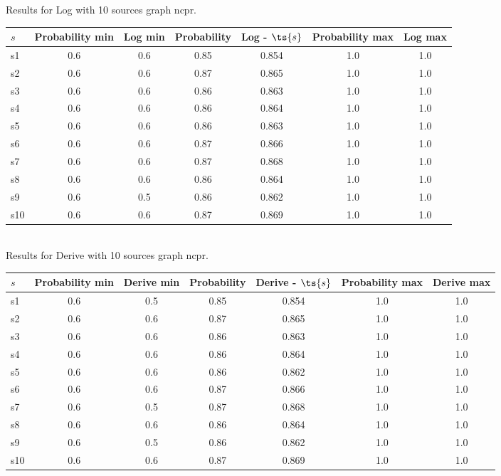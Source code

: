 \documentclass{article}
\begin{document}
\noindent Results for Log with 10 sources graph ncpr.

\noindent\begin{tabular}{|l|c|c|c|c|c|c|}
\hline
$s$& Probability min & Log min & Probability & Log - $\ts{s}$ & Probability max & Log max\\
\hline
s1 &0.6 & 0.6 & 0.85 & 0.854 & 1.0 & 1.0\\
\hline
s2 &0.6 & 0.6 & 0.87 & 0.865 & 1.0 & 1.0\\
\hline
s3 &0.6 & 0.6 & 0.86 & 0.863 & 1.0 & 1.0\\
\hline
s4 &0.6 & 0.6 & 0.86 & 0.864 & 1.0 & 1.0\\
\hline
s5 &0.6 & 0.6 & 0.86 & 0.863 & 1.0 & 1.0\\
\hline
s6 &0.6 & 0.6 & 0.87 & 0.866 & 1.0 & 1.0\\
\hline
s7 &0.6 & 0.6 & 0.87 & 0.868 & 1.0 & 1.0\\
\hline
s8 &0.6 & 0.6 & 0.86 & 0.864 & 1.0 & 1.0\\
\hline
s9 &0.6 & 0.5 & 0.86 & 0.862 & 1.0 & 1.0\\
\hline
s10 &0.6 & 0.6 & 0.87 & 0.869 & 1.0 & 1.0\\
\hline
\end{tabular}\\

\noindent Results for Derive with 10 sources graph ncpr.

\noindent\begin{tabular}{|l|c|c|c|c|c|c|}
\hline
$s$& Probability min & Derive min & Probability & Derive - $\ts{s}$ & Probability max & Derive max\\
\hline
s1 &0.6 & 0.5 & 0.85 & 0.854 & 1.0 & 1.0\\
\hline
s2 &0.6 & 0.6 & 0.87 & 0.865 & 1.0 & 1.0\\
\hline
s3 &0.6 & 0.6 & 0.86 & 0.863 & 1.0 & 1.0\\
\hline
s4 &0.6 & 0.6 & 0.86 & 0.864 & 1.0 & 1.0\\
\hline
s5 &0.6 & 0.6 & 0.86 & 0.862 & 1.0 & 1.0\\
\hline
s6 &0.6 & 0.6 & 0.87 & 0.866 & 1.0 & 1.0\\
\hline
s7 &0.6 & 0.5 & 0.87 & 0.868 & 1.0 & 1.0\\
\hline
s8 &0.6 & 0.6 & 0.86 & 0.864 & 1.0 & 1.0\\
\hline
s9 &0.6 & 0.5 & 0.86 & 0.862 & 1.0 & 1.0\\
\hline
s10 &0.6 & 0.6 & 0.87 & 0.869 & 1.0 & 1.0\\
\hline
\end{tabular}\\
\end{document}
